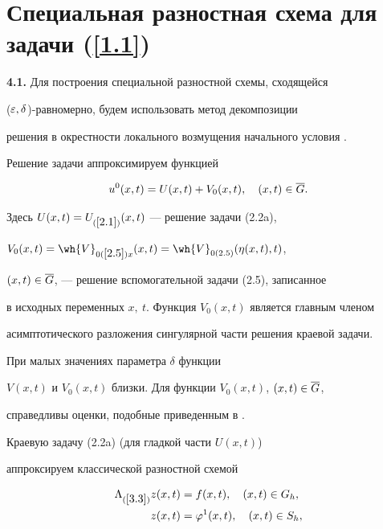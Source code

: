\section{Специальная разностная схема для задачи \protect(\ref{1.1})}


 


{\bf 4.1.} Для построения специальной разностной схемы, сходящейся 


($\varepsilon,\delta$)-равномерно, будем использовать метод декомпозиции


решения в окрестности локального возмущения начального условия \cite{Sh2}. 


Решение задачи аппроксимируем функцией


$$


u^0(x,t)=U(x,t)+V_0(x,t),\quad (x,t)\in\ovl{G}.


$$


Здесь $U(x,t)=U_{(\ref{2.1})}(x,t)$ --- решение задачи (2.2a),


$V_0(x,t)=\wh{V}_{0(\ref{2.5})x}(x,t)=\wh{V}_{0(2.5)}(\eta(x,t),t)$,


$(x,t)\in\overline{G}$, --- решение вспомогательной задачи (2.5), записанное


в исходных переменных $x,\ t$. Функция $V_0(x,t)$ является главным членом


асимптотического разложения сингулярной части решения краевой задачи.


При малых значениях параметра $\delta$ функции


$V(x,t)$ и $V_0(x,t)$ близки. Для функции $V_0(x,t)$, $(x,t)\in \overline{G}$,


справедливы оценки, подобные приведенным в \cite{Sh2}.





Краевую задачу (2.2a) (для гладкой части $U(x,t)$) 


аппроксируем классической разностной схемой


\begin{align}\label{4.1}


\begin{split}


\Lambda_{(\ref{3.3})}z(x,t)&=f(x,t),\quad (x,t)\in G_h,\\


z(x,t)&=\vf^1(x,t),\quad (x,t)\in S_h,


\end{split}


\end{align}


